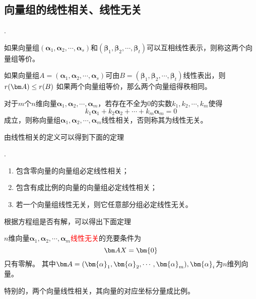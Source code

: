 \subsection{向量组的线性相关、线性无关}
.
\begin{theorem}
    如果向量组$(\bm{\alpha}_1,\bm{\alpha}_2,\cdots,\bm{\alpha}_s)$和$(\bm{\beta}_1,\bm{\beta}_2,\cdots,\bm{\beta}_t)$可以互相线性表示，则称这两个向量组等价。
\end{theorem}

\begin{theorem}
    如果向量组$A = (\bm{\alpha}_1,\bm{\alpha}_2,\cdots,\bm{\alpha}_s)$可由$B = (\bm{\beta}_1,\bm{\beta}_2,\cdots,\bm{\beta}_t)$线性表出，则$r(\mat{A})\leq r(B)$
    如果两个向量组等价，那么两个向量组得秩相同。
\end{theorem}

\begin{definition}
    对于$m$个$n$维向量$\bm{\alpha}_1,\bm{\alpha}_2,\cdots,\bm{\alpha}_m$，若存在不全为$0$的实数$k_1,k_2,\cdots,k_m$使得
    \[ k_1\bm{\alpha}_1 + k_2\bm{\alpha}_2 + \cdots + k_m\bm{\alpha}_m = 0 \]
    成立，则称向量组$\bm{\alpha}_1,\bm{\alpha}_2,\cdots,\bm{\alpha}_m$线性相关，否则称其为线性无关。
\end{definition}
由线性相关的定义可以得到下面的定理
\begin{theorem}
    .
    \begin{enumerate}
        \item 包含零向量的向量组必定线性相关；
        \item 包含有成比例的向量的向量组必定线性相关；
        \item 若一个向量组线性无关，则它任意部分组必定线性无关。
    \end{enumerate}
\end{theorem}

根据方程组是否有解，可以得出下面定理
\begin{theorem}
    $n$维向量$\bm{\alpha}_1,\bm{\alpha}_2,\cdots,\bm{\alpha}_m$\textcolor{red}{线性无关}的充要条件为
    \[\mat{AX}=\bm{0}\]
    只有零解。
    其中$\mat{A}=(\bm{\alpha}_1,\bm{\alpha}_2,\cdots,\bm{\alpha}_m),\bm{\alpha}_i$为$n$维列向量。
\end{theorem}
特别的，两个向量线性相关，其向量的对应坐标分量成比例。


